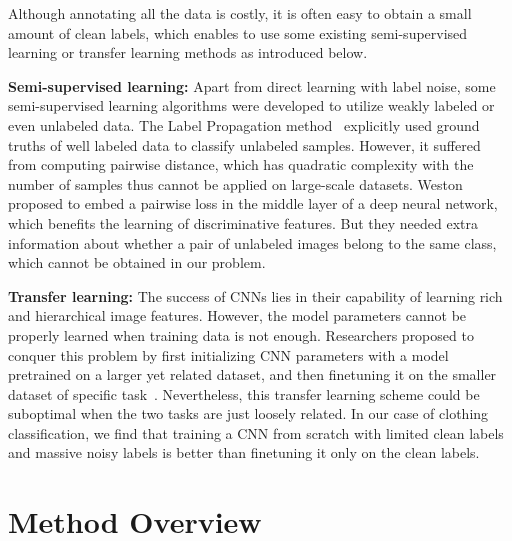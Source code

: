 Although annotating all the data is costly, it is often easy to obtain a small amount of clean labels, which enables to use some existing semi-supervised learning or transfer learning methods as introduced below.

{\bf Semi-supervised learning:} Apart from direct learning with label noise, some semi-supervised learning algorithms were developed to utilize weakly labeled or even unlabeled data. The Label Propagation method~\cite{zhu2002learning} explicitly used ground truths of well labeled data to classify unlabeled samples. However, it suffered from computing pairwise distance, which has quadratic complexity with the number of samples thus cannot be applied on large-scale datasets. Weston \etal~\cite{weston2012deep} proposed to embed a pairwise loss in the middle layer of a deep neural network, which benefits the learning of discriminative features. But they needed extra information about whether a pair of unlabeled images belong to the same class, which cannot be obtained in our problem.

{\bf Transfer learning:} The success of CNNs lies in their capability of learning rich and hierarchical image features. However, the model parameters cannot be properly learned when training data is not enough. Researchers proposed to conquer this problem by first initializing CNN parameters with a model pretrained on a larger yet related dataset, and then finetuning it on the smaller dataset of specific task~\cite{krizhevsky2012imagenet, oquab2014learning, azizpour2015generic,donahue2014decaf}. Nevertheless, this transfer learning scheme could be suboptimal when the two tasks are just loosely related. In our case of clothing classification, we find that training a CNN from scratch with limited clean labels and massive noisy labels is better than finetuning it only on the clean labels.

\section{Method Overview} %
\label{sec:nl-overview}

